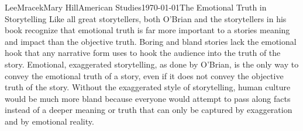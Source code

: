 \documentclass[letterpaper, 11pt]{article}
\begin{document}
\begin{mla}{Lee}{Mracek}{Mary Hill}{American Studies}{\today}{The Emotional Truth in Storytelling}
    Like all great storytellers, both O'Brian and the storytellers in his book recognize that emotional truth is far more important to a stories meaning and impact than the objective truth. Boring and bland stories lack the emotional hook that any narrative form uses to hook the audience into the truth of the story. Emotional, exaggerated storytelling, as done by O'Brian, is the only way to convey the emotional truth of a story, even if it does not convey the objective truth of the story. Without the exaggerated style of storytelling, human culture would be much more bland because everyone would attempt to pass along facts instead of a deeper meaning or truth that can only be captured by exaggeration and by emotional reality.
\clearpage
\printbibliography
\end{mla}
\end{document}
